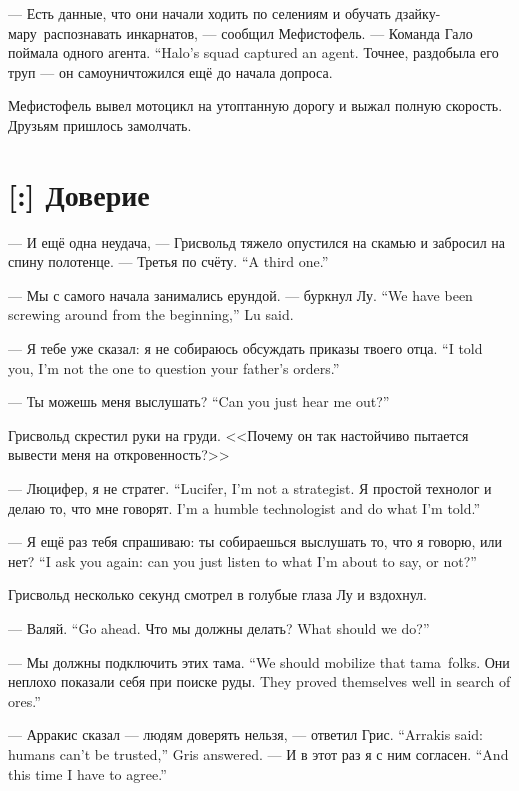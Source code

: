 --- Есть данные, что они начали ходить по селениям и обучать дзайку-мару\FM\ распознавать инкарнатов, --- сообщил Мефистофель.
{--- Команда Гало поймала одного агента.}
{``Halo's squad captured an agent.}
Точнее, раздобыла его труп --- он самоуничтожился ещё до начала допроса.

Мефистофель вывел мотоцикл на утоптанную дорогу и выжал полную скорость.
Друзьям пришлось замолчать.

\section{[:] Доверие}

--- И ещё одна неудача, --- Грисвольд тяжело опустился на скамью и забросил на спину полотенце.
{--- Третья по счёту.}
{``A third one.''}

{--- Мы с самого начала занимались ерундой. --- буркнул Лу.}
{``We have been screwing around from the beginning,'' Lu said.}

{--- Я тебе уже сказал: я не собираюсь обсуждать приказы твоего отца.}
{``I  told you, I'm not the one to question your father's orders.''}

{--- Ты можешь меня выслушать?}
{``Can you just hear me out?''}

Грисвольд скрестил руки на груди.
<<Почему он так настойчиво пытается вывести меня на откровенность?>>

{--- Люцифер, я не стратег.}
{``Lucifer, I'm not a strategist.}
{Я простой технолог и делаю то, что мне говорят.}
{I'm a humble technologist and do what I'm told.''}

{--- Я ещё раз тебя спрашиваю: ты собираешься выслушать то, что я говорю, или нет?}
{``I ask you again: can you just listen to what I'm about to say, or not?''}

Грисвольд несколько секунд смотрел в голубые глаза Лу и вздохнул.

{--- Валяй.}
{``Go ahead.}
{Что мы должны делать?}
{What should we do?''}

{--- Мы должны подключить этих тама\FM.}
{``We should mobilize that tama\FM\ folks.}
{Они неплохо показали себя при поиске руды.}
{They proved themselves well in search of ores.''}

{--- Арракис сказал --- людям доверять нельзя, --- ответил Грис.}
{``Arrakis said: humans can't be trusted,'' Gris answered.}
{--- И в этот раз я с ним согласен.}
{``And this time I have to agree.''}

